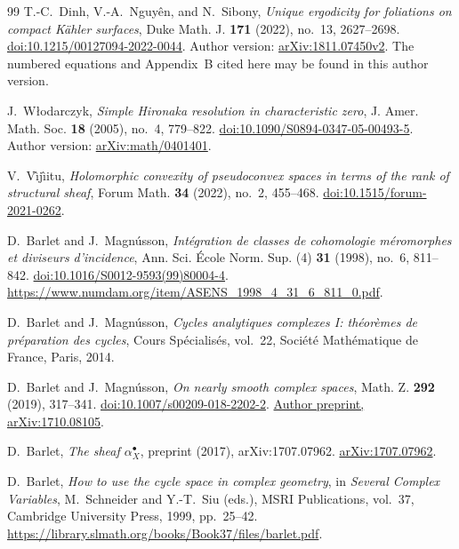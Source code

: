 \documentclass[11pt]{amsart}
\theoremstyle{definition}
\theoremstyle{remark}
\numberwithin{equation}{section}
\begin{document}
\begin{thebibliography}{99}
T.-C.~Dinh, V.-A.~Nguy\^en, and N.~Sibony,
\emph{Unique ergodicity for foliations on compact K\"ahler surfaces},
Duke Math. J. \textbf{171} (2022), no.~13, 2627--2698.
\href{https://doi.org/10.1215/00127094-2022-0044}{doi:10.1215/00127094-2022-0044}.
Author version: \href{https://arxiv.org/abs/1811.07450v2}{arXiv:1811.07450v2}.
The numbered equations and Appendix~B cited here may be found in this
author version.

J.~W{\l}odarczyk,
\emph{Simple Hironaka resolution in characteristic zero},
J. Amer. Math. Soc. \textbf{18} (2005), no.~4, 779--822.
\href{https://doi.org/10.1090/S0894-0347-05-00493-5}{doi:10.1090/S0894-0347-05-00493-5}.
Author version: \href{https://arxiv.org/abs/math/0401401}{arXiv:math/0401401}.


V.~V\^{\i}j\^{\i}itu,
\emph{Holomorphic convexity of pseudoconvex spaces in terms of
the rank of structural sheaf},
Forum Math. \textbf{34} (2022), no.~2, 455--468.
\href{https://doi.org/10.1515/forum-2021-0262}{doi:10.1515/forum-2021-0262}.

D.~Barlet and J.~Magn\'usson,
\emph{Int\'egration de classes de cohomologie m\'eromorphes et
diviseurs d'incidence},
Ann. Sci. \'Ecole Norm. Sup. (4) \textbf{31} (1998),
no.~6, 811--842.
\href{https://doi.org/10.1016/S0012-9593(99)80004-4}
{doi:10.1016/S0012-9593(99)80004-4}.
\url{https://www.numdam.org/item/ASENS_1998_4_31_6_811_0.pdf}.

D.~Barlet and J.~Magn\'usson,
\emph{Cycles analytiques complexes I: th\'eor\`emes de
pr\'eparation des cycles},
Cours Sp\'ecialis\'es, vol.~22,
Soci\'et\'e Math\'ematique de France, Paris, 2014.

D.~Barlet and J.~Magn\'usson,
\emph{On nearly smooth complex spaces},
Math. Z. \textbf{292} (2019), 317--341.
\href{https://doi.org/10.1007/s00209-018-2202-2}{doi:10.1007/s00209-018-2202-2}.
\href{https://arxiv.org/abs/1710.08105}{Author preprint, arXiv:1710.08105}.

D.~Barlet, \emph{The sheaf \(\alpha_X^\bullet\)},
preprint (2017), arXiv:1707.07962.
\href{https://arxiv.org/abs/1707.07962}{arXiv:1707.07962}.

D.~Barlet, \emph{How to use the cycle space in complex geometry},
in \emph{Several Complex Variables},
M.~Schneider and Y.-T.~Siu (eds.),
MSRI Publications, vol.~37, Cambridge University Press, 1999,
pp.~25--42.
\url{https://library.slmath.org/books/Book37/files/barlet.pdf}.

\end{thebibliography}
\end{document}
